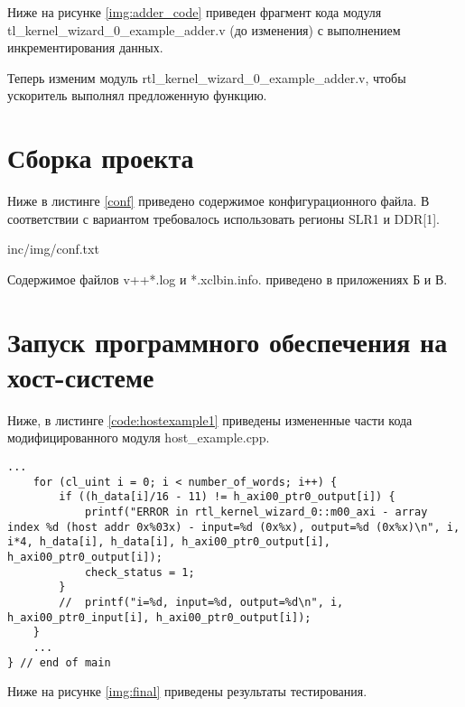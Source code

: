 Ниже на рисунке \ref{img:adder_code} приведен фрагмент кода модуля tl\_kernel\_wizard\_0\_example\_adder.v (до изменения) с выполнением инкрементирования данных.


Теперь изменим модуль rtl\_kernel\_wizard\_0\_example\_adder.v, чтобы ускоритель выполнял предложенную функцию.




\section{Сборка проекта}

Ниже в листинге \ref{conf} приведено содержимое конфигурационного файла. В соответствии с вариантом требовалось использовать регионы SLR1 и DDR[1].

\begin{lstinputlisting}[
	caption={Содержимое конфигурационного файла},
	label={conf},
	]{inc/img/conf.txt}
\end{lstinputlisting}

Содержимое файлов v++*.log и *.xclbin.info. приведено в приложениях Б и В.

\section{Запуск программного обеспечения на хост-системе}

Ниже, в листинге \ref{code:hostexample1} приведены измененные части кода модифицированного модуля host\_example.cpp. 

\begin{lstlisting}[label=code:hostexample1, caption=Модуль host\_example.cpp]
   ...
    for (cl_uint i = 0; i < number_of_words; i++) {
    	if ((h_data[i]/16 - 11) != h_axi00_ptr0_output[i]) {
    		printf("ERROR in rtl_kernel_wizard_0::m00_axi - array index %d (host addr 0x%03x) - input=%d (0x%x), output=%d (0x%x)\n", i, i*4, h_data[i], h_data[i], h_axi00_ptr0_output[i], h_axi00_ptr0_output[i]);
    		check_status = 1;
    	}
    	//  printf("i=%d, input=%d, output=%d\n", i,  h_axi00_ptr0_input[i], h_axi00_ptr0_output[i]);
    }
    ...
} // end of main
\end{lstlisting}

Ниже на рисунке \ref{img:final} приведены результаты тестирования.


